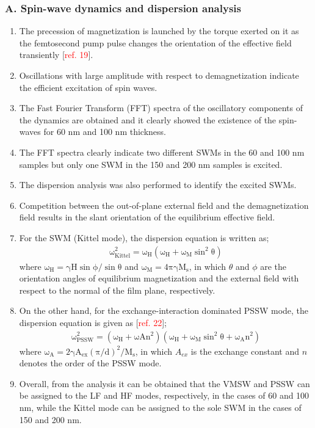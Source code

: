 \subsubsection*{A. Spin-wave dynamics and dispersion analysis}
\begin{enumerate}
    \item The precession of magnetization is launched by the torque exerted on it as the femtosecond pump pulse changes the orientation of the effective field transiently [\textcolor{red}{ref. 19}].
    \item Oscillations with large amplitude with respect to demagnetization indicate the efficient excitation of spin waves.
    \item The Fast Fourier Transform (FFT) spectra of the oscillatory components of the dynamics are obtained and it clearly showed the existence of the spin-waves for 60 nm and 100 nm thickness.
    \item The FFT spectra clearly indicate two different SWMs in the 60 and 100 nm samples but only one SWM in the 150 and 200 nm samples is excited.
    \item The dispersion analysis was also performed to identify the excited SWMs.
    \item Competition between the out-of-plane external field and the demagnetization field results in the slant orientation of the equilibrium effective field.
    \item For the SWM (Kittel mode), the dispersion equation is written as;
    \begin{gather}
        \mathrm{\omega^2_{Kittel}=\omega_H(\omega_H+\omega_M\sin^2\theta)}
    \end{gather}
    where $\mathrm{\omega_H=\gamma H\sin \phi/\sin\theta}$ and $\mathrm{\omega_M=4\pi\gamma M_s}$, in which $\theta$ and $\phi$ are the orientation angles of equilibrium magnetization and the external field with respect to the normal of the film plane, respectively.
    \item On the other hand, for the exchange-interaction dominated PSSW mode, the dispersion equation is given as [\textcolor{red}{ref. 22}];
    \begin{gather}
        \mathrm{\omega^2_{PSSW}=(\omega_H+\omega An^2)(\omega_H+\omega_M\sin^2\theta+\omega_A n^2)}
    \end{gather}
    where $\mathrm{\omega_A=2\gamma A_{ex}(\pi/d)^2/M_s}$, in which $A_{ex}$ is the exchange constant and $n$ denotes the order of the PSSW mode.
    \item Overall, from the analysis it can be obtained that the VMSW and PSSW can be assigned to the LF and HF modes, respectively, in the cases of 60 and 100 nm, while the Kittel mode can be assigned to the sole SWM in the cases of 150 and 200 nm.
\end{enumerate}
